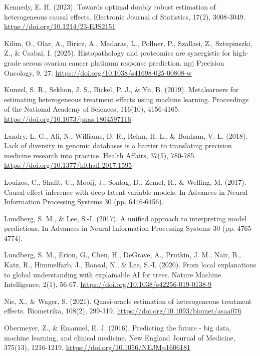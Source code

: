 Kennedy, E. H. (2023). Towards optimal doubly robust estimation of heterogeneous causal effects. Electronic Journal of Statistics, 17(2), 3008-3049. \href{https://doi.org/10.1214/23-EJS2157}{https://doi.org/10.1214/23-EJS2151}

Kilim, O., Olar, A., Biricz, A., Madaras, L., Pollner, P., Szallasi, Z., Sztupinszki, Z., \& Csabai, I. (2025). Histopathology and proteomics are synergistic for high-grade serous ovarian cancer platinum response prediction. npj Precision Oncology, 9, 27. \href{https://www.nature.com/articles/s41698-025-00808-w}{https://doi.org/10.1038/s41698-025-00808-w}

Kunzel, S. R., Sekhon, J. S., Bickel, P. J., \& Yu, B. (2019). Metalearners for estimating heterogeneous treatment effects using machine learning. Proceedings of the National Academy of Sciences, 116(10), 4156-4165. \href{https://www.pnas.org/doi/full/10.1073/pnas.1804597116}{https://doi.org/10.1073/pnas.1804597116}

Landry, L. G., Ali, N., Williams, D. R., Rehm, H. L., \& Bonham, V. L. (2018). Lack of diversity in genomic databases is a barrier to translating precision medicine research into practice. Health Affairs, 37(5), 780-785. \href{https://www.healthaffairs.org/doi/10.1377/hlthaff.2017.1595}{https://doi.org/10.1377/hlthaff.2017.1595}

Louizos, C., Shalit, U., Mooij, J., Sontag, D., Zemel, R., \& Welling, M. (2017). Causal effect inference with deep latent-variable models. In Advances in Neural Information Processing Systems 30 (pp. 6446-6456).

Lundberg, S. M., \& Lee, S.-I. (2017). A unified approach to interpreting model predictions. In Advances in Neural Information Processing Systems 30 (pp. 4765-4774).

Lundberg, S. M., Erion, G., Chen, H., DeGrave, A., Prutkin, J. M., Nair, B., Katz, R., Himmelfarb, J., Bansal, N., \& Lee, S.-I. (2020). From local explanations to global understanding with explainable AI for trees. Nature Machine Intelligence, 2(1), 56-67. \href{https://www.nature.com/articles/s42256-019-0138-9}{https://doi.org/10.1038/s42256-019-0138-9}

Nie, X., \& Wager, S. (2021). Quasi-oracle estimation of heterogeneous treatment effects. Biometrika, 108(2), 299-319. \href{https://academic.oup.com/biomet/article-abstract/108/2/299/5911092?redirectedFrom=fulltext}{https://doi.org/10.1093/biomet/asaa076}

Obermeyer, Z., \& Emanuel, E. J. (2016). Predicting the future - big data, machine learning, and clinical medicine. New England Journal of Medicine, 375(13), 1216-1219. \href{https://www.nejm.org/doi/10.1056/NEJMp1606181}{https://doi.org/10.1056/NEJMp1606181}


